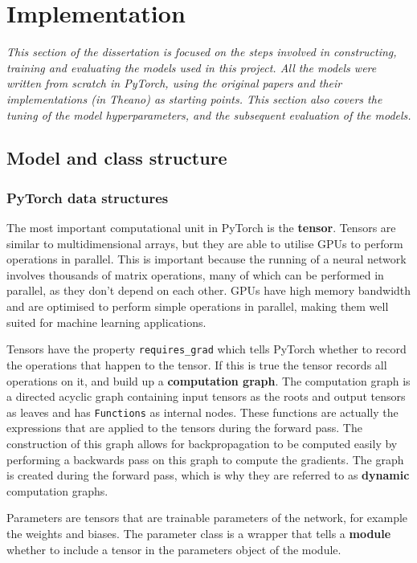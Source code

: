 \chapter{Implementation}

\textit{This section of the dissertation is focused on the steps involved in constructing, training and evaluating the models used in this project.
All the models were written from scratch in PyTorch, using the original papers and their implementations (in Theano) as starting points.
This section also covers the tuning of the model hyperparameters, and the subsequent evaluation of the models.}

\section{Model and class structure}

\subsection{PyTorch data structures}
The most important computational unit in PyTorch is the \textbf{tensor}. Tensors are similar to multidimensional arrays, but they are able to 
utilise GPUs to perform operations in parallel. This is important because the running of a neural network involves thousands of matrix 
operations, many of which can be performed in parallel, as they don't depend on each other. GPUs have high memory bandwidth and are 
optimised to perform simple operations in parallel, making them well suited for machine learning applications.

Tensors have the property \texttt{requires\_grad} which tells PyTorch whether to record the operations that happen to the tensor. If 
this is true the tensor records all operations on it, and build up a \textbf{computation graph}. The computation graph is a 
directed acyclic graph containing input tensors as the roots and output
tensors as leaves and has \texttt{Functions} as internal nodes. These functions are actually the expressions that are applied to the 
tensors during the forward pass. The construction of this graph allows for backpropagation to be computed easily by performing a 
backwards pass on this graph to compute the gradients. The graph is created during the forward pass, which is why they are referred to 
as \textbf{dynamic} computation graphs.

Parameters are tensors that are trainable parameters of the network, for example the weights and biases. The parameter class is a 
wrapper that tells a \textbf{module} whether to include a tensor in the parameters object of the module.

